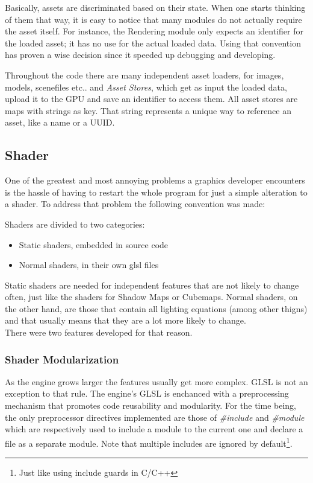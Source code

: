 Basically, assets are discriminated based on their state. When one starts thinking of them that
way, it is easy to notice that many modules do not actually require the asset itself. For
instance, the Rendering module only expects an identifier for the loaded asset; it has no use
for the actual loaded data. Using that convention has proven a wise decision since it speeded
up debugging and developing.

Throughout the code there are many independent asset loaders, for images, models, scenefiles etc..
and \textit{Asset Stores}, which get as input the loaded data, upload it to the GPU and save an
identifier to access them. All asset stores are maps with strings as key. That string represents
a unique way to reference an asset, like a name or a UUID\@.

\subsection{Shader}
One of the greatest and most annoying problems a graphics developer encounters is the hassle of
having to restart the whole program for just a simple alteration to a shader. To address that
problem the following convention was made:

\noindent Shaders are divided to two categories:

\begin{itemize}
\item Static shaders, embedded in source code
\item Normal shaders, in their own glsl files
\end{itemize}

\noindent Static shaders are needed for independent features that are not likely to change often,
just like the shaders for Shadow Maps or Cubemaps. Normal shaders, on the other hand, are those
that contain all lighting equations (among other thigns) and that usually means that they are a
lot more likely to change.\\
There were two features developed for that reason.

\subsubsection{Shader Modularization}
As the engine grows larger the features usually get more complex. GLSL is not an exception to that
rule. The engine's GLSL is enchanced with a preprocessing mechanism that promotes code reusability
and modularity. For the time being, the only preprocessor directives implemented are those of
\textit{\#include} and \textit{\#module} which are respectively used to include a module to the
current one and declare a file as a separate module. Note that multiple includes are ignored by
default\footnote{Just like using include guards in C/C++}.

